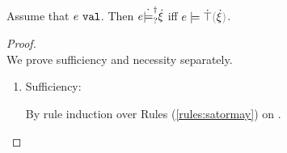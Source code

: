 \begin{lemma}
  \label{lem:val-satisfy-truify}
  Assume that $e ~\mathtt{val}$. Then $e \dot{\models}_{?}^{\dag} \dot{\xi}$ iff $\ccsatisfy{e}{\ctruify{\hxi}}$.
\end{lemma}
\begin{proof}\mbox{}\\
  We prove sufficiency and necessity separately.
  \begin{enumerate}
    \item Sufficiency:
      By rule induction over Rules (\ref{rules:satormay}) on .
      \begin{byCases}


\end{byCases}
\end{enumerate}
\end{proof}
